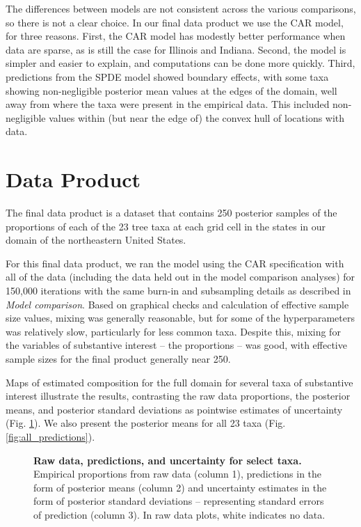 \documentclass[10pt,letterpaper]{article}
\begin{document}
The differences between models are not consistent across the various
comparisons, so there is not a clear choice. In our final data product
we use the CAR model, for three reasons. First, the CAR model has
modestly better performance when data are sparse, as is still the
case for Illinois and Indiana. Second, the model is simpler and easier
to explain, and computations can be done more quickly. Third, predictions
from the SPDE model showed boundary effects, with some taxa showing
non-negligible posterior mean values at the edges of the domain, well
away from where the taxa were present in the empirical data. This
included non-negligible values within (but near the edge of) the convex
hull of locations with data. 





\section*{Data Product\label{sec:Data-product}}

The final data product is a dataset that contains 250 posterior samples
of the proportions of each of the 23 tree taxa at each grid cell in
the states in our domain of the northeastern United States.

For this final data product, we ran the model using the CAR specification
with all of the data (including the data held out
in the model comparison analyses) for 150,000 iterations with the
same burn-in and subsampling details as described in \emph{Model comparison}.
Based on graphical checks and calculation of effective sample size
values, mixing was generally reasonable, but for some of the hyperparameters
was relatively slow, particularly for less common taxa. Despite this,
mixing for the variables of substantive interest -- the proportions
-- was good, with effective sample sizes for the final product generally
near 250.

Maps of estimated composition for the full domain for several taxa
of substantive interest illustrate the results, contrasting the raw
data proportions, the posterior means, and posterior standard deviations
as pointwise estimates of uncertainty (Fig. \ref{fig:select_maps}).
We also present the posterior means for all 23 taxa (Fig. \ref{fig:all_predictions}).


\begin{figure}


\caption{{\bf Raw data, predictions, and uncertainty for select taxa.} 
\\Empirical proportions from raw data (column 1), predictions in the
form of posterior means (column 2) and uncertainty estimates in the
form of posterior standard deviations -- representing standard errors
of prediction (column 3). In raw data plots, white indicates no data.}
\label{fig:select_maps}
\end{figure}
\end{document}
